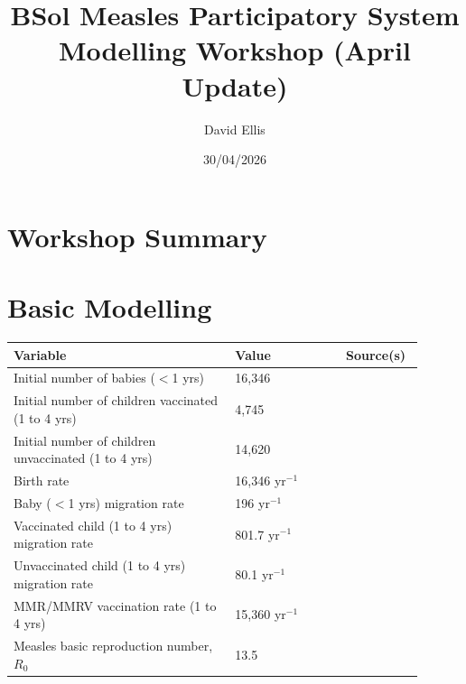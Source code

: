 \documentclass{article}
\title{BSol Measles Participatory System Modelling Workshop (April Update)}
\author{David Ellis}
\date{30/04/2026}
\begin{document}
\maketitle

\section{Workshop Summary}

\section{Basic Modelling}

\begin{table}[ht!]
    \begin{tabular}{p{0.5\linewidth} | p{0.25\linewidth} | p{0.15\linewidth}}
    \toprule
    \textbf{Variable} & \textbf{Value} & \textbf{Source(s)}\\ \midrule
    
    Initial number of babies ($<$1 yrs) & 16,346 & \cite{ONS2021census} \\
    
    Initial number of children vaccinated (1 to 4 yrs) & 4,745&  \cite{ONS2021census, NHSEngland2026FDP}  \\
    
    Initial number of children unvaccinated (1 to 4 yrs) & 14,620 & \cite{ONS2021census, NHSEngland2026FDP} \\
    
    Birth rate & 16,346 yr$^{-1}$ & \cite{ONS2021census} \\
    
    Baby ($<$1 yrs) migration rate & 196 yr$^{-1}$ & \cite{ONS2021census} \\
    
    Vaccinated child (1 to 4 yrs) migration rate & 801.7 yr$^{-1}$ & \cite{ONS2021census, WHO_measles_coverage} \\
    
    Unvaccinated child (1 to 4 yrs) migration rate & 80.1 yr$^{-1}$ & \cite{ONS2021census, WHO_measles_coverage} \\

    MMR/MMRV vaccination rate (1 to 4 yrs) & 15,360 yr$^{-1}$ & \cite{NHSEngland2026FDP} \\

    Measles basic reproduction number, $R_0$ & 13.5 & \cite{https://doi.org/10.1111/risa.12637} \\


\end{tabular}
\end{table}
\end{document}
